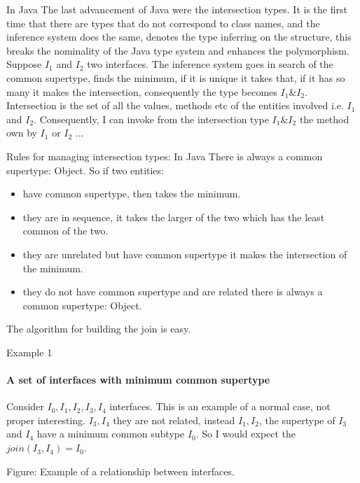 \documentclass{beamer}
\begin{document}
\begin{frame}{In Java}
    The last advancement of Java were the intersection types.\newline
    It is the first time that there are types that do not correspond to class names, and the inference system does the same, denotes the type inferring on the structure, this breaks the nominality of the Java type system and enhances the polymorphism.\newline\newline
    Suppose $I_1$ and $I_2$ two interfaces. The inference system goes in search of the common supertype, finds the minimum, if it is unique it takes that, if it has so many it makes the intersection, consequently the type becomes $I_1\&I_2$.\newline\newline
    Intersection is the set of all the values, methods etc of the entities involved i.e. $I_1$ and $I_2$. Consequently, I can invoke from the intersection type $I_1 \& I_2$ the method own by $I_1$ or $I_2$ ...
\end{frame}

\begin{frame}{Rules for managing intersection types: In Java}
There is always a common supertype: Object.\newline
So if two entities:
\begin{itemize}
\item  have common supertype, then takes the minimum.
\item  they are in sequence, it takes the larger of the two which has the least common of the two.
\item  they are unrelated but have common supertype it makes the intersection of the minimum.
\item  they do not have common supertype and are related there is always a common supertype: Object.
\end{itemize}
The algorithm for building the join is easy.
    
\end{frame}

\begin{frame}{Example 1}
\framesubtitle{A set of interfaces with minimum common supertype}
Consider $I_0,I_1,I_2,I_3,I_4$ interfaces.\newline
This is an example of a normal case, not proper interesting.\newline
$I_3, I_4$ they are not related, instead $I_1, I_2$, the supertype of $I_3$ and $I_4$ have a minimum common subtype $I_0$. So I would expect the $join(I_3,I_4)=I_0$.
\begin{center}
\end{center}
Figure: Example of a relationship between interfaces.
\end{frame}
\end{document}
